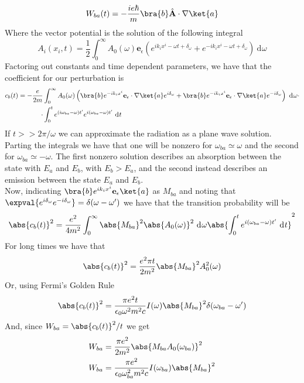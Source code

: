 \documentclass[a4paper, 11pt]{book}
\renewcommand{\vec}[1]{\mathbf{#1}}
\newcommand{\ver}[1]{\vec{e}_{#1}}
\newcommand{\1}{\opr{\mathds{1}}}
\newcommand{\diff}[2][]{\ \mathrm{d}^{#1}#2}
\newcommand{\opr}[1]{\hat{#1}}
\newcommand{\vecopr}[1]{\opr{\vec{#1}}}
\theoremstyle{plain}
\begin{document}
	\begin{equation}
		W_{ba}(t)=-\frac{ie\hbar}{m}\bra{b}\vecopr{A}\cdot\nabla\ket{a}
		\label{eq:empertmatrix}
	\end{equation}
	Where the vector potential is the solution of the following integral
	\begin{equation}
		A_i(x_i,t)=\frac{1}{2}\int_{0}^{\infty}A_0(\omega)\ver{\epsilon}\left( e^{ik_ix^i-\omega t+\delta_{\omega}}+e^{-ik_ix^i-\omega t +\delta_{\omega}} \right)\diff{\omega}
		\label{eq:vectorpotentialem}
	\end{equation}
	Factoring out constants and time dependent parameters, we have that the coefficient for our perturbation is
	\begin{equation}
		\begin{aligned}
			c_b(t)=-\frac{e}{2m}&\int_{0}^{\infty}A_0(\omega)\left( \bra{b}e^{-ik_ix^i}\ver{\epsilon}\cdot\nabla\ket{a}e^{i\delta_{\omega}}+\bra{b}e^{-ik_ix^i}\ver{\epsilon}\cdot\nabla\ket{a}e^{-i\delta_{\omega}} \right)\diff{\omega}\cdot\\
			\cdot&\int_{0}^{t}e^{(i\omega_{ba}-\omega)t'}e^{i(\omega_{ba}-\omega)t'}\diff{t}
		\end{aligned}
		\label{eq:transitionprobqem}
	\end{equation}
	If $t>>2\pi/\omega$ we can approximate the radiation as a plane wave solution. Parting the integrals we have that one will be nonzero for $\omega_{ba}\simeq\omega$ and the second for $\omega_{ba}\simeq-\omega$. The first nonzero solution describes an absorption between the state with $E_{a}$ and $E_b$, with $E_b>E_a$, and the second instead describes an emission between the state $E_a$ and $E_b$.\\
	Now, indicating $\bra{b}e^{ik_ix^i}\ver{\epsilon}\ket{a}$ as $M_{ba}$ and noting that $\expval{e^{i\delta_{\omega}}e^{-i\delta_{\omega}}}=\delta(\omega-\omega')$ we have that the transition probability will be
	\begin{equation}
		\abs{c_b(t)}^2=\frac{e^2}{4m^2}\int_{0}^{\infty}\abs{M_{ba}}^2\abs{A_0(\omega)}^2\diff{\omega}\abs{\int_{0}^{t}e^{i(\omega_{ba}-\omega)t'}\diff{t}}^2
		\label{eq:transprob}
	\end{equation}
	For long times we have that
	\begin{equation*}
		\abs{c_b(t)}^2=\frac{e^2\pi t}{2m^2}\abs{M_{ba}}^2A_0^2(\omega)
	\end{equation*}
	Or, using Fermi's Golden Rule
	\begin{equation}
		\abs{c_b(t)}^2=\frac{\pi e^2t}{\epsilon_0\omega^2m^2c}I(\omega)\abs{M_{ba}}^2\delta(\omega_{ba}-\omega')
		\label{eq:transprobfermi}
	\end{equation}
	And, since $W_{ba}=\abs{c_b(t)}^2/t$ we get
	\begin{equation}
		\begin{aligned}
			W_{ba}&=\frac{\pi e^2}{2m^2}\abs{M_{ba}A_0(\omega_{ba})}^2\\
			W_{ba}&=\frac{\pi e^2}{\epsilon_0\omega_{ba}^2m^2c}I(\omega_{ba})\abs{M_{ba}}^2
		\end{aligned}
		\label{eq:perttransem}
	\end{equation}
\end{document}
